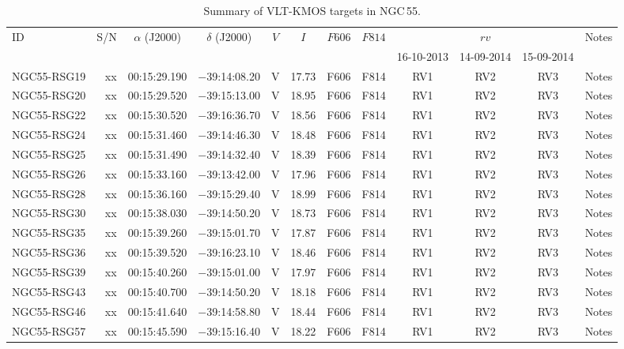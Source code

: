 \begin{table}
\caption[Summary of VLT-KMOS targets in NGC\,55]{Summary of VLT-KMOS targets in NGC\,55.\label{tb:n55obs-params}}
\scriptsize
\begin{threeparttable}
\centering
\begin{tabular}{lrcccccccccl}
 \hline
 \hline
ID & S/N & $\alpha$ (J2000) & $\delta$ (J2000) & $V$ & $I$ & $F606$ & $F814$ & \multicolumn{3}{c}{$rv$} (\kms) & Notes \\
& &  & & & & & & 16-10-2013 & 14-09-2014 & 15-09-2014\\

 \hline
NGC55-RSG19 & xx & 00:15:29.190 & $-$39:14:08.20& V & 17.73 & F606 & F814 & RV1 & RV2 & RV3 & Notes\\
NGC55-RSG20 & xx & 00:15:29.520 & $-$39:15:13.00& V & 18.95 & F606 & F814 & RV1 & RV2 & RV3 & Notes\\
NGC55-RSG22 & xx & 00:15:30.520 & $-$39:16:36.70& V & 18.56 & F606 & F814 & RV1 & RV2 & RV3 & Notes\\
NGC55-RSG24 & xx & 00:15:31.460 & $-$39:14:46.30& V & 18.48 & F606 & F814 & RV1 & RV2 & RV3 & Notes\\
NGC55-RSG25 & xx & 00:15:31.490 & $-$39:14:32.40& V & 18.39 & F606 & F814 & RV1 & RV2 & RV3 & Notes\\
NGC55-RSG26 & xx & 00:15:33.160 & $-$39:13:42.00& V & 17.96 & F606 & F814 & RV1 & RV2 & RV3 & Notes\\
NGC55-RSG28 & xx & 00:15:36.160 & $-$39:15:29.40& V & 18.99 & F606 & F814 & RV1 & RV2 & RV3 & Notes\\
NGC55-RSG30 & xx & 00:15:38.030 & $-$39:14:50.20& V & 18.73 & F606 & F814 & RV1 & RV2 & RV3 & Notes\\
NGC55-RSG35 & xx & 00:15:39.260 & $-$39:15:01.70& V & 17.87 & F606 & F814 & RV1 & RV2 & RV3 & Notes\\
NGC55-RSG36 & xx & 00:15:39.520 & $-$39:16:23.10& V & 18.46 & F606 & F814 & RV1 & RV2 & RV3 & Notes\\
NGC55-RSG39 & xx & 00:15:40.260 & $-$39:15:01.00& V & 17.97 & F606 & F814 & RV1 & RV2 & RV3 & Notes\\
NGC55-RSG43 & xx & 00:15:40.700 & $-$39:14:50.20& V & 18.18 & F606 & F814 & RV1 & RV2 & RV3 & Notes\\
NGC55-RSG46 & xx & 00:15:41.640 & $-$39:14:58.80& V & 18.44 & F606 & F814 & RV1 & RV2 & RV3 & Notes\\
NGC55-RSG57 & xx & 00:15:45.590 & $-$39:15:16.40& V & 18.22 & F606 & F814 & RV1 & RV2 & RV3 & Notes\\

\end{tabular}
\end{threeparttable}
\end{table}
